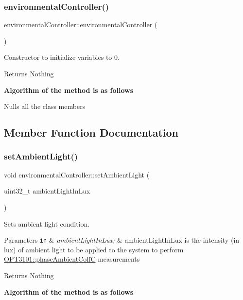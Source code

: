 \subsubsection{\texorpdfstring{environmental\+Controller()}{environmentalController()}}
{\footnotesize\ttfamily environmental\+Controller\+::environmental\+Controller (\begin{DoxyParamCaption}{ }\end{DoxyParamCaption})}



Constructor to initialize variables to 0. 

\begin{DoxyReturn}{Returns}
Nothing 
\end{DoxyReturn}
{\bfseries Algorithm of the method is as follows}


\begin{DoxyItemize}
\item Nulls all the class members 
\end{DoxyItemize}

\subsection{Member Function Documentation}
\mbox{\label{classenvironmental_controller_adc63a8d9dbdbcef5768cf34692c6465c}} 
\subsubsection{\texorpdfstring{set\+Ambient\+Light()}{setAmbientLight()}}
{\footnotesize\ttfamily void environmental\+Controller\+::set\+Ambient\+Light (\begin{DoxyParamCaption}\item[{uint32\+\_\+t}]{ambient\+Light\+In\+Lux }\end{DoxyParamCaption})}



Sets ambient light condition. 


\begin{DoxyParams}[1]{Parameters}
\mbox{\tt in}  & {\em ambient\+Light\+In\+Lux;} & ambient\+Light\+In\+Lux is the intensity (in lux) of ambient light to be applied to the system to perform \mbox{\hyperlink{class_o_p_t3101_1_1phase_ambient_coff_c}{O\+P\+T3101\+::phase\+Ambient\+CoffC}} measurements \\
\hline
\end{DoxyParams}
\begin{DoxyReturn}{Returns}
Nothing 
\end{DoxyReturn}
{\bfseries Algorithm of the method is as follows} \mbox{\label{classenvironmental_controller_a3c23e944f34f2d7c0fa0b279d5fc8a3f}} 
